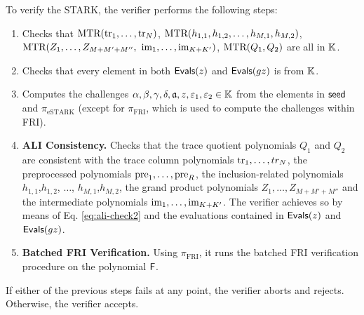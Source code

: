 To verify the STARK, the verifier performs the following steps:
\begin{enumerate}
  \item Checks that $\text{MTR}(\text{tr}_1,\dots,\text{tr}_N)$, $\text{MTR}(h_{1,1},h_{1,2}, \dots, h_{M,1},h_{M,2})$, $\text{MTR}(Z_1,\dots,Z_{M+M'+M''},$ $\text{im}_1,\dots,\text{im}_{K+K'})$, $\text{MTR}(Q_1,Q_2)$ are all in $\mathbb{K}$.
  \item Checks that every element in both $\textsf{Evals}(z)$ and $\textsf{Evals}(gz)$ is from $\mathbb{K}$.
  \item Computes the challenges $\alpha,\beta,\gamma,\delta,\mathfrak{a},z,\varepsilon_1,\varepsilon_2 \in \mathbb{K}$ from the elements in $\textsf{seed}$ and $\pi_{\text{eSTARK}}$ (except for $\pi_{\text{FRI}}$, which is used to compute the challenges within FRI).
  
  \item \textbf{ALI Consistency.} Checks that the trace quotient polynomials $Q_1$ and $Q_2$ are consistent with the trace column polynomials $\text{tr}_1,\dots,tr_N$, the preprocessed polynomials $\text{pre}_1,\dots,\text{pre}_R$, the inclusion-related polynomials $h_{1,1}$,$h_{1,2}$, $\dots$, $h_{M,1}$,$h_{M,2}$, the grand product polynomials $Z_1, \dots, Z_{M+M'+M''}$ and the intermediate polynomials $\text{im}_1,\dots,\text{im}_{K+K'}$. The verifier achieves so by means of Eq. \eqref{eq:ali-check2} and the evaluations contained in $\textsf{Evals}(z)$ and $\textsf{Evals}(gz)$.
  
  \item \textbf{Batched FRI Verification.} Using $\pi_{\text{FRI}}$, it runs the batched FRI verification procedure on the polynomial $\textsf{F}$.
\end{enumerate}

If either of the previous steps fails at any point, the verifier aborts and rejects. Otherwise, the verifier accepts.
